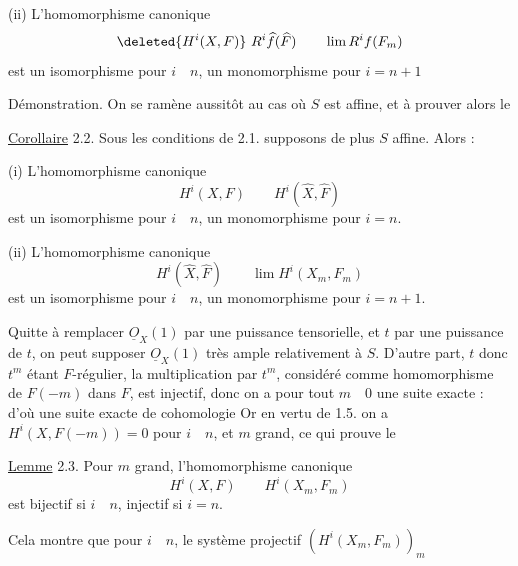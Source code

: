 
(ii) L'homomorphisme canonique
\[
\deleted{H^i(X,F)}\ R^i\widehat f(\widehat F)\qquad \lim R^if(F_m)
\]
est un isomorphisme pour $i\quad n$, un monomorphisme pour $i=n+1$ \deleted{\unsure{;}}

Démonstration. On se ramène aussitôt au cas où $S$ est affine, et à prouver alors le

\uline{Corollaire} 2.2. Sous les conditions de 2.1. supposons de plus $S$ affine.
Alors :

(i) L'homomorphisme canonique
\[
H^i(X,F)\qquad H^i(\widehat X,\widehat F)
\]
est un isomorphisme pour $i\quad n$, un monomorphisme pour $i=n$.

(ii) L'homomorphisme canonique
\[
H^i(\widehat X,\widehat F)\qquad \lim H^i(X_m,F_m)
\]
est un isomorphisme pour $i\quad n$, un monomorphisme pour $i=n+1$.

 Quitte à remplacer $\underline O_X(1)$ par une puissance tensorielle, et $t$ par une puissance de $t$, on peut supposer $\underline O_X(1)$ très ample relativement à $S$. D'autre part, $t$ donc $t^m$ étant $F$-régulier, la multiplication par $t^m$, considéré comme homomorphisme de $F(-m)$ dans $F$, est injectif, donc on a pour tout $m\quad 0$ une suite exacte :
d'où une suite exacte de cohomologie
Or en vertu de 1.5. on a $H^i(X,F(-m))=0$ pour $i\quad n$, et $m$ grand, ce qui prouve le

\uline{Lemme} 2.3.  Pour $m$ grand, l'homomorphisme canonique
\[
H^i(X,F)\qquad H^i(X_m,F_m)
\]
est bijectif si $i\quad n$, injectif si $i=n$.

Cela montre que pour $i\quad n$, le système projectif $(H^i(X_m,F_m))_m$


